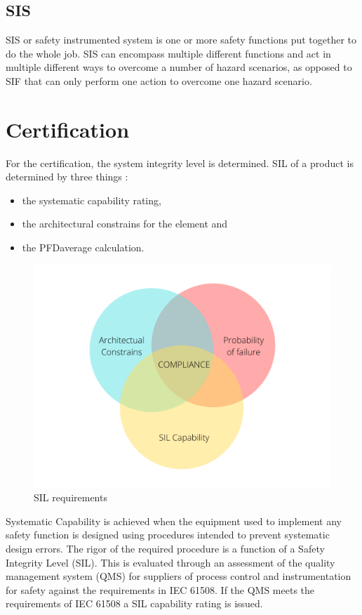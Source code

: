 \subsection{SIS}
\label{sec:sis}

SIS or safety instrumented system is one or more safety functions put together to do the whole job. SIS can encompass multiple different functions and act in multiple different ways to overcome a number of hazard scenarios, as opposed to SIF that can only perform one action to overcome one hazard scenario.

\section{Certification}


For the certification, the system integrity level is determined. SIL of a product is determined by three things \citep{func_safety_fundamentals}:
\begin{itemize}

    \item the systematic capability rating,
    \item the architectural constrains for the element and
    \item the PFDaverage calculation.
    
\end{itemize}

\begin{figure}[H]

      \centering
      \includegraphics[width=0.7\linewidth]{images/sil_requirements.png}
      \caption{SIL requirements}
      \label{fig:sil_requirements}
    
\end{figure}

Systematic Capability is achieved when the equipment used to implement any safety function is designed using procedures intended to prevent systematic design errors.  The rigor of the required procedure is a function of a Safety Integrity Level (SIL). This is evaluated through an assessment of the quality management system (QMS) for suppliers of process control and instrumentation for safety against the requirements in IEC 61508.  If the QMS meets the requirements of IEC 61508 a SIL capability rating is issued. 

